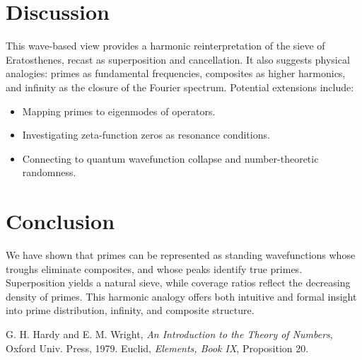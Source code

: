 \documentclass[reprint,amsmath,amssymb,aps,pra]{revtex4-2}
\begin{document}
\section{Discussion}
This wave-based view provides a harmonic reinterpretation of the sieve of Eratosthenes, recast as superposition and cancellation. It also suggests physical analogies: primes as fundamental frequencies, composites as higher harmonics, and infinity as the closure of the Fourier spectrum. Potential extensions include:
\begin{itemize}
\item Mapping primes to eigenmodes of operators.
\item Investigating zeta-function zeros as resonance conditions.
\item Connecting to quantum wavefunction collapse and number-theoretic randomness.
\end{itemize}

\section{Conclusion}
We have shown that primes can be represented as standing wavefunctions whose troughs eliminate composites, and whose peaks identify true primes. Superposition yields a natural sieve, while coverage ratios reflect the decreasing density of primes. This harmonic analogy offers both intuitive and formal insight into prime distribution, infinity, and composite structure.


\begin{thebibliography}{9}
 G. H. Hardy and E. M. Wright, \textit{An Introduction to the Theory of Numbers}, Oxford Univ. Press, 1979.
 Euclid, \textit{Elements, Book IX}, Proposition 20.
\end{thebibliography}
\end{document}

